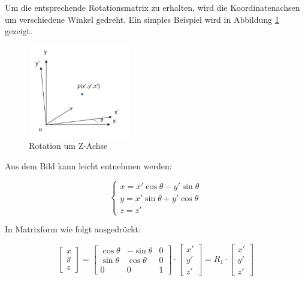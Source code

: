 Um die entsprechende Rotationsmatrix zu erhalten, wird die Koordinatenachsen um verschiedene Winkel gedreht. Ein simples Beispiel wird in Abbildung \ref{fig:rotation} gezeigt.

\begin{figure}[H]
 \centering 
 \includegraphics[keepaspectratio,width=0.4\textwidth]{images/3_Ersteverfahren/Kamera/rotationsmatrix.pdf}
 \caption{Rotation um Z-Achse}
 \label{fig:rotation}
\end{figure} 

Aus dem Bild kann leicht entnehmen werden:

\begin{equation}
   \begin{cases} 
	x = x'\cos\theta - y'\sin\theta \\	
	y = x'\sin\theta + y'\cos\theta \\
	z = z'
	\end{cases}
\end{equation}

In Matrixform wie folgt ausgedrückt:

\begin{equation}
   \begin{bmatrix}
	x \\  
	y \\
	z
	\end{bmatrix} = \begin{bmatrix}
	\cos\theta & -\sin\theta & 0	\\
	\sin\theta & \cos\theta  & 0	\\
	0    	   & 0           & 1	
	\end{bmatrix} \cdot \begin{bmatrix}
	x' \\  
	y' \\
	z'
	\end{bmatrix}= R_1 \cdot \begin{bmatrix}
	x' \\  
	y' \\
	z'
	\end{bmatrix}
\end{equation}

